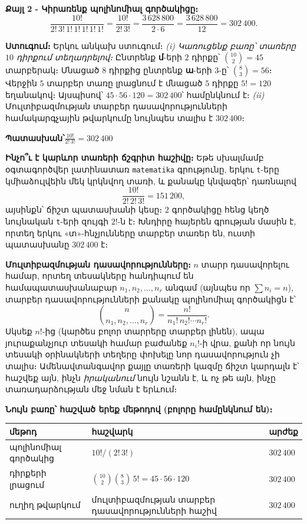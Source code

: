 \documentclass[11pt,a4paper]{article}
\newcommand{\answer}[1]{\begin{answerbox}\centering\textbf{Պատասխան՝}\quad #1\end{answerbox}}
\begin{document}
\textbf{Քայլ 2 - Կիրառենք պոլինոմիալ գործակիցը։}
$$\frac{10!}{2!\,3!\,1!\,1!\,1!\,1!\,1!}=\frac{10!}{2!\,3!}
   =\frac{3\,628\,800}{2\cdot 6}=\frac{3\,628\,800}{12}=302\,400.$$

\textbf{Ստուգում։} Երկու անկախ ստուգում։
\emph{(i) Կառուցենք բառը՝ տառերը $10$ դիրքում տեղադրելով։} Ընտրենք \textbf{մ}-երի $2$ դիրքը՝
$\binom{10}{2}=45$ տարբերակ։ Մնացած $8$ դիրքից ընտրենք \textbf{ա}-երի $3$-ը՝ $\binom{8}{3}=56$։
Վերջին $5$ տարբեր տառը լրացնում է մնացած $5$ դիրքը $5!=120$ եղանակով։ Այսպիսով՝
$45\cdot 56\cdot 120 = 302\,400$՝ համընկնում է։ \emph{(ii)} Մուլտիբազմության տարբեր
դասավորությունների համակարգչային թվարկումը նույնպես տալիս է $302\,400$։ \checkmark

\answer{$\displaystyle \frac{10!}{2!\,3!}=302\,400$}

\medskip
\textbf{Ինչո՞ւ է կարևոր տառերի ճշգրիտ հաշիվը։} Եթե սխալմամբ օգտագործվեր լատինատառ
\texttt{matematika} գրությունը, երկու \texttt{t}-երը կմիաձուլվեին մեկ կրկնվող տառի, և քանակը
կնվազեր՝ դառնալով
$$\frac{10!}{2!\,2!\,3!}=151\,200,$$
այսինքն՝ ճիշտ պատասխանի կեսը։ $2$ գործակիցը հենց կեղծ նույնական \texttt{t}-երի զույգի $2!$-ն է։
Խնդիրը հայերեն գրության մասին է, որտեղ երկու «տ»-հնչյունները տարբեր տառեր են, ուստի պատասխանը
$302\,400$ է։

\begin{methodbox}
\textbf{Մուլտիբազմության դասավորությունները։} $n$ տարր դասավորելու համար,
որտեղ տեսակները հանդիպում են համապատասխանաբար $n_1,n_2,\dots,n_r$ անգամ (այնպես որ $\sum n_i=n$),
տարբեր դասավորությունների քանակը պոլինոմիալ գործակիցն է՝
$$\binom{n}{n_1,n_2,\dots,n_r}=\frac{n!}{n_1!\,n_2!\cdots n_r!}.$$
Սկսեք $n!$-ից (կարծես բոլոր տարրերը տարբեր լինեն), ապա յուրաքանչյուր տեսակի համար բաժանեք $n_i!$-ի
վրա, քանի որ նույն տեսակի օրինակների տեղերը փոխելը նոր դասավորություն չի տալիս։ Ամենավտանգավոր քայլը
տառերի կազմը ճիշտ կարդալն է՝ հաշվեք այն, ինչն \emph{իրականում} նույն նշանն է, և ոչ թե այն, ինչը
տառադարձության մեջ նման է երևում։
\end{methodbox}

\medskip
\textbf{Նույն բառը՝ հաշված երեք մեթոդով (բոլորը համընկնում են)։}

\begin{center}
\small
\begin{tabular}{@{}lll@{}}
\toprule
մեթոդ & հաշվարկ & արժեք\\
\midrule
պոլինոմիալ գործակից & $10!/(2!\,3!)$                        & $302\,400$\\
դիրքերի լրացում        & $\binom{10}{2}\binom{8}{3}\,5!=45\cdot56\cdot120$ & $302\,400$\\
ուղիղ թվարկում         & մուլտիբազմության տարբեր դասավորությունների հաշիվ  & $302\,400$\\
\bottomrule
\end{tabular}
\end{center}
\end{document}
